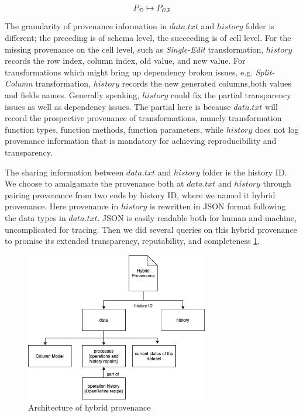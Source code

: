 \begin{equation}
    P_\mathcal{D} \mapsto P_\mathcal{OR}
\end{equation}

The granularity of provenance information in $data.txt$ and $history$ folder is different; the preceding is of schema level, the succeeding is of cell level. For the missing provenance on the cell level, such as \textit{Single-Edit} transformation, $history$ records the row index, column index, old value, and new value.
For transformations which might bring up dependency broken issues, e.g. \textit{Split-Column} transformation, $history$ records the new generated columns,both values and fields names. Generally speaking, $history$ could fix the partial transparency issues as well as dependency issues. The partial here is because $data.txt$ will record the prospective provenance of transformations, namely transformation function types, function methods, function parameters, while $history$ does not log provenance information that is mandatory for achieving reproducibility and transparency. 

The sharing information between $data.txt$ and $history$ folder is the history ID. We choose to amalgamate the provenance both at $data.txt$ and $history$ through pairing provenance from two ends by history ID, where we named it hybrid provenance. Here provenance in $history$ is rewritten in JSON format following the data types in $data.txt$. JSON is easily readable both for human and machine, uncomplicated for tracing. Then we did several queries on this hybrid provenance to promise its extended transparency, reputability, and completeness \ref{fig:hp_archi}. 

\begin{figure}
\centering
\includegraphics[width=8cm]{Figure/hybrid_provenance_archi.png}
\caption{Architecture of hybrid provenance}
\label{fig:hp_archi}
\end{figure}
